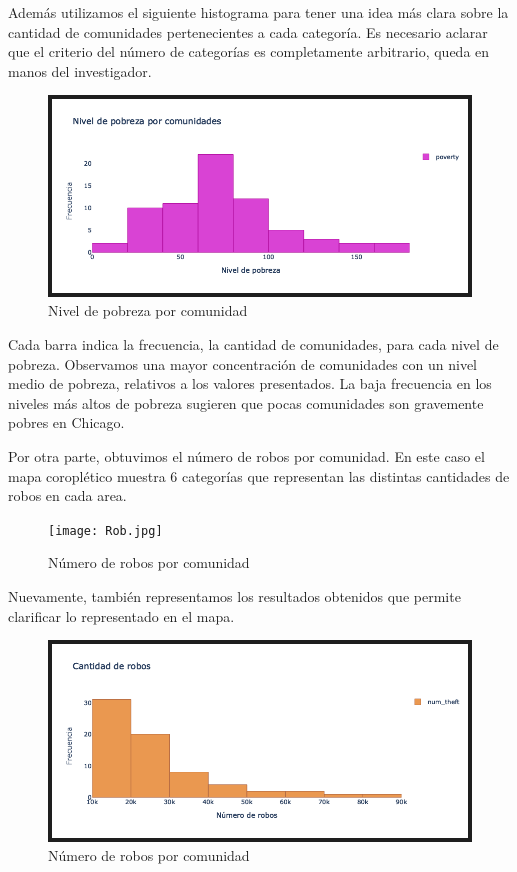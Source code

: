 \documentclass[11pt, spanish]{article}
\begin{document}
\indent Además utilizamos el siguiente histograma para tener una idea más clara sobre la cantidad de comunidades pertenecientes a cada categoría. Es necesario aclarar que el criterio del número de categorías es completamente arbitrario, queda en manos del investigador. 

\begin{figure}[hbtp]
\caption{Nivel de pobreza por comunidad}
\centering
\includegraphics[width=12cm]{Pobgra1.jpg}
\end{figure}

\indent Cada barra indica la frecuencia, la cantidad de comunidades, para cada nivel de pobreza. Observamos una mayor concentración de comunidades con un nivel medio de pobreza, relativos a los valores presentados. La baja frecuencia en los niveles más altos de pobreza sugieren que pocas comunidades son gravemente pobres en Chicago. 
\clearpage

\indent Por otra parte, obtuvimos el número de robos por comunidad. En este caso el mapa coroplético muestra 6 categorías que representan las distintas cantidades de robos en cada area. 

\begin{figure}[hbtp]
\caption{Número de robos por comunidad}
\centering
\texttt{[image: Rob.jpg]}
\end{figure}
\clearpage

\indent Nuevamente, también representamos los resultados obtenidos que permite clarificar lo representado en el mapa. 


\begin{figure}[hbtp]
\caption{Número de robos por comunidad}
\centering
\includegraphics[width=12cm]{Robgra.jpg}
\end{figure}
\end{document}
